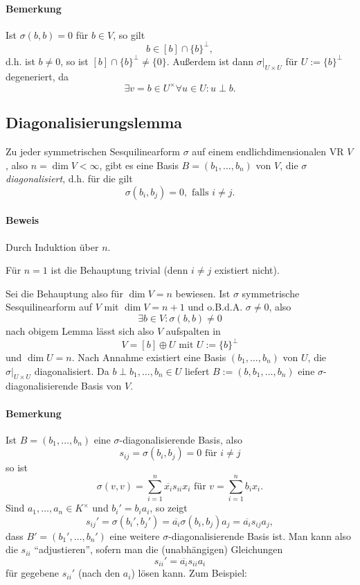 \paragraph{Bemerkung}
	Ist $ \sigma(b,b) = 0 $ für $ b \in V $, so gilt
		\[ b\in [b]\cap \{b\}^\perp, \]
	d.h. ist $ b\neq 0 $, so ist $ [b]\cap \{b\}^\perp \neq \{0\}$. Außerdem ist dann $ \sigma\big|_{U\times U} $ für $ U:= \{b\}^\perp $ degeneriert, da
		\[ \exists v = b \in U^\times \forall u\in U: u\perp b.\]
		
\subsection{Diagonalisierungslemma}
	Zu jeder symmetrischen Sesquilinearform $ \sigma $ auf einem endlichdimensionalen VR $ V $, also $ n = \dim V < \infty $,  gibt es eine Basis $ B = (b_1,\dots,b_n) $ von $ V $, die $ \sigma $ \emph{diagonalisiert}, d.h. für die gilt
		\[ \sigma(b_i,b_j)=0, \text{ falls } i\neq j. \]
\paragraph{Beweis}
	Durch Induktion über $ n $.
	
	Für $ n = 1 $ ist die Behauptung trivial (denn $ i\neq j $ existiert nicht).
	
	Sei die Behauptung also für $\dim V = n $ bewiesen. Ist $ \sigma $ symmetrische Sesquilinearform auf $ V $ mit $ \dim V = n+1 $ und o.B.d.A. $ \sigma \neq 0 $, also
		\[ \exists b\in V: \sigma(b,b) \neq 0 \]
	nach obigem Lemma lässt sich also $ V $ aufspalten in 
		\[ V = [b]\oplus U \text{ mit } U:=\{b\}^\perp \]
	und $ \dim U = n $. Nach Annahme existiert eine Basis $ (b_1,\dots,b_n) $ von $ U $, die $ \sigma|_{U\times U} $ diagonalisiert. Da $ b \perp b_1,\dots,b_n \in U$ liefert $ B := (b,b_1,\dots,b_n) $ eine $ \sigma $-diagonalisierende Basis von $ V $. 
\paragraph{Bemerkung}
	Ist $ B = (b_1,\dots,b_n) $ eine $ \sigma $-diagonalisierende Basis, also
		\[ s_{ij} = \sigma(b_i,b_j) = 0 \text{ für } i\neq j \]
	so ist
		\[ \sigma(v,v) = \sum_{i=1}^{n}\overline{x_i}s_{ii}x_i \text{ für } v = \sum_{i=1}^{n}b_ix_i. \]
	Sind $ a_1,\dots,a_n\in K^\times $ und $ b_i' = b_ia_i $, so zeigt
		\[ s_{ij}' = \sigma(b_i',b_j') = \overline{a_i}\sigma(b_i,b_j)a_j = \overline{a_i}s_{ij}a_j, \]
	dass $ B' = (b_1',\dots,b_n') $ eine weitere $ \sigma $-diagonalisierende Basis ist.
	Man kann also die $ s_{ii} $ "`adjustieren"', sofern man die (unabhängigen) Gleichungen
		\[ s_{ii}' = \overline{a_i}s_{ii}a_i \]
	für gegebene $ s_{ii}' $ (nach den $ a_i $) lösen kann. Zum Beispiel:
